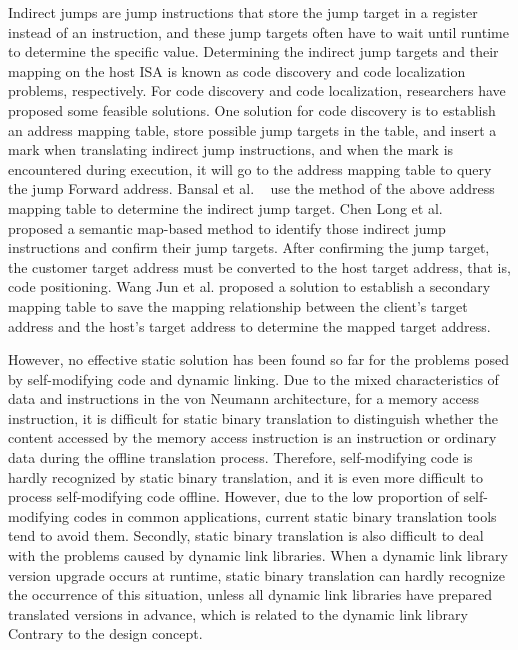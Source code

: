 Indirect jumps are jump instructions that store the jump target in a register instead of an instruction, and these jump targets often have to wait until runtime to determine the specific value.
Determining the indirect jump targets and their mapping on the host ISA is known as code discovery and code localization problems, respectively. 
For code discovery and code localization, researchers have proposed some feasible solutions. 
One solution for code discovery is to establish an address mapping table, store possible jump targets in the table, and insert a mark when translating indirect jump instructions, and when the mark is encountered during execution, it will go to the address mapping table to query the jump Forward address.
Bansal et al. ~\cite{bansal2008binary} use the method of the above address mapping table to determine the indirect jump target.
Chen Long et al. ~\cite{chenlong2008} proposed a semantic map-based method to identify those indirect jump instructions and confirm their jump targets.
After confirming the jump target, the customer target address must be converted to the host target address, that is, code positioning.
Wang Jun et al. \cite{wangjun2019} proposed a solution to establish a secondary mapping table to save the mapping relationship between the client's target address and the host's target address to determine the mapped target address.

However, no effective static solution has been found so far for the problems posed by self-modifying code and dynamic linking.
Due to the mixed characteristics of data and instructions in the von Neumann architecture, for a memory access instruction, it is difficult for static binary translation to distinguish whether the content accessed by the memory access instruction is an instruction or ordinary data during the offline translation process.
Therefore, self-modifying code is hardly recognized by static binary translation, and it is even more difficult to process self-modifying code offline.
However, due to the low proportion of self-modifying codes in common applications, current static binary translation tools tend to avoid them.
Secondly, static binary translation is also difficult to deal with the problems caused by dynamic link libraries.
When a dynamic link library version upgrade occurs at runtime, static binary translation can hardly recognize the occurrence of this situation, unless all dynamic link libraries have prepared translated versions in advance, which is related to the dynamic link library Contrary to the design concept.

